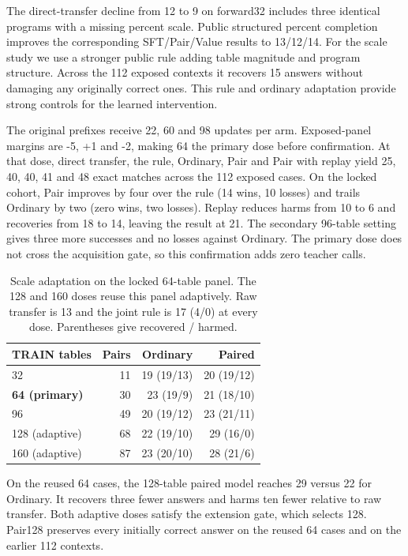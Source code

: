\documentclass[10pt,letterpaper,conference]{IEEEtran}
\begin{document}
The direct-transfer decline from 12 to 9 on forward32 includes three identical programs with a missing percent scale. Public structured percent completion improves the corresponding SFT/Pair/Value results to 13/12/14. For the scale study we use a stronger public rule adding table magnitude and program structure. Across the 112 exposed contexts it recovers 15 answers without damaging any originally correct ones. This rule and ordinary adaptation provide strong controls for the learned intervention.

The original prefixes receive 22, 60 and 98 updates per arm. Exposed-panel margins are -5, +1 and -2, making 64 the primary dose before confirmation. At that dose, direct transfer, the rule, Ordinary, Pair and Pair with replay yield 25, 40, 40, 41 and 48 exact matches across the 112 exposed cases. On the locked cohort, Pair improves by four over the rule (14 wins, 10 losses) and trails Ordinary by two (zero wins, two losses). Replay reduces harms from 10 to 6 and recoveries from 18 to 14, leaving the result at 21. The secondary 96-table setting gives three more successes and no losses against Ordinary. The primary dose does not cross the acquisition gate, so this confirmation adds zero teacher calls.

\begin{table}[!t]
\centering
\caption{Scale adaptation on the locked 64-table panel. The 128 and 160 doses reuse this panel adaptively. Raw transfer is 13 and the joint rule is 17 (4/0) at every dose. Parentheses give recovered / harmed.}
\label{tab:3}
\begin{tabular}{@{}lrrr@{}}
\toprule
TRAIN tables & Pairs & Ordinary & Paired \\
\midrule
32 & 11 & 19 (19/13) & 20 (19/12) \\
\textbf{64 (primary)} & 30 & 23 (19/9) & 21 (18/10) \\
96 & 49 & 20 (19/12) & 23 (21/11) \\
128 (adaptive) & 68 & 22 (19/10) & 29 (16/0) \\
160 (adaptive) & 87 & 23 (20/10) & 28 (21/6) \\
\bottomrule
\end{tabular}
\end{table}

On the reused 64 cases, the 128-table paired model reaches 29 versus 22 for Ordinary. It recovers three fewer answers and harms ten fewer relative to raw transfer. Both adaptive doses satisfy the extension gate, which selects 128. Pair128 preserves every initially correct answer on the reused 64 cases and on the earlier 112 contexts.
\end{document}
